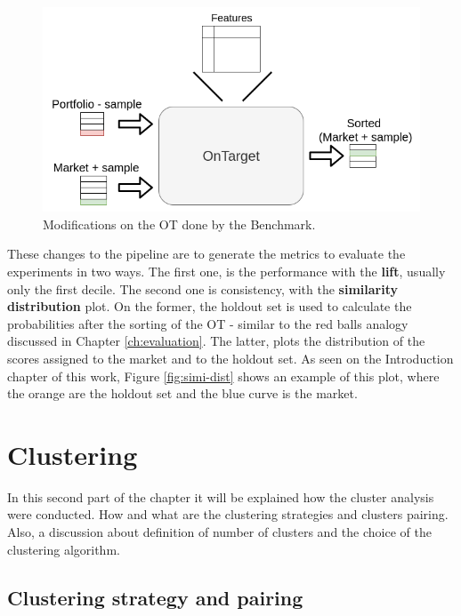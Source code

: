 \begin{figure}[h]
   \centering
   \includegraphics[width=\linewidth]{fig/ch3-ot-benchmark-blocks.png}
   \caption{Modifications on the OT done by the Benchmark.}
   \label{fig:ot-benchmark-blocks}
\end{figure}

These changes to the pipeline are to generate the metrics to evaluate the experiments in two ways. The first one, is the performance with the \textbf{lift}, usually only the first decile. The second one is consistency, with the \textbf{similarity distribution} plot. On the former, the holdout set is used to calculate the probabilities after the sorting of the OT - similar to the red balls analogy discussed in Chapter \ref{ch:evaluation}. The latter, plots the distribution of the scores assigned to the market and to the holdout set. As seen on the Introduction chapter of this work, Figure \ref{fig:simi-dist} shows an example of this plot, where the orange are the holdout set and the blue curve is the market.

\section{Clustering}

In this second part of the chapter it will be explained how the cluster analysis were conducted. How and what are the clustering strategies and clusters pairing. Also, a discussion about definition of number of clusters and the choice of the clustering algorithm.

\subsection{Clustering strategy and pairing}

\newcommand{\fullNameClusterStrategyA}{Train on Portfolio}
\newcommand{\nameClusterStrategyA}{ToP}
\newcommand{\fullNameClusterStrategyB}{Train on All}
\newcommand{\nameClusterStrategyB}{ToA}
\newcommand{\fullNameClusterPairingA}{One versus One}
\newcommand{\nameClusterPairingA}{OvO}
\newcommand{\fullNameClusterPairingB}{One versus All}
\newcommand{\nameClusterPairingB}{OvA}


